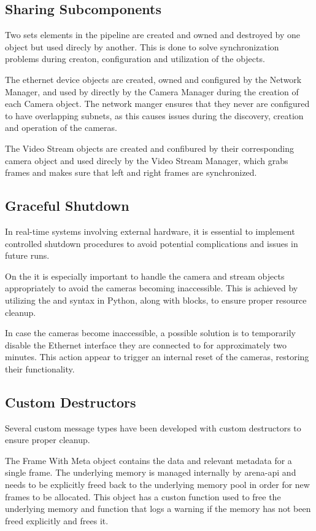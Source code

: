 \subsection{Sharing Subcomponents}
Two sets elements in the pipeline are created and owned and destroyed by one object but used direcly by another.
This is done to solve synchronization problems during creaton, configuration and utilization of the objects.

The ethernet device objects are created, owned and configured by the Network Manager, and used by directly by the Camera Manager during the creation of each Camera object.
The network manger ensures that they never are configured to have overlapping subnets, as this causes issues during the discovery, creation and operation of the cameras.

The Video Stream objects are created and confibured by their corresponding camera object and used direcly by the Video Stream Manager, which grabs frames and makes sure that left and right frames are synchronized.

\subsection{Graceful Shutdown}
In real-time systems involving external hardware, it is essential to implement controlled shutdown procedures to avoid potential complications and issues in future runs.

On the \sr it is especially important to handle the camera and stream objects appropriately to avoid the cameras becoming inaccessible.
This is achieved by utilizing the  and  syntax in Python, along with  blocks, to ensure proper resource cleanup.

In case the cameras become inaccessible, a possible solution is to temporarily disable the Ethernet interface they are connected to for approximately two minutes.
This action appear to trigger an internal reset of the cameras, restoring their functionality.

\subsection{Custom Destructors}
Several custom message types have been developed with custom destructors to ensure proper cleanup.

The Frame With Meta object contains the data and relevant metadata for a single frame.
The underlying memory is managed internally by \gls{arena-api} and needs to be explicitly freed back to the underlying memory pool in order for new frames to be allocated.
This object has a custon  function used to free the underlying memory and  function that logs a warning if the memory has not been freed explicitly and frees it.

